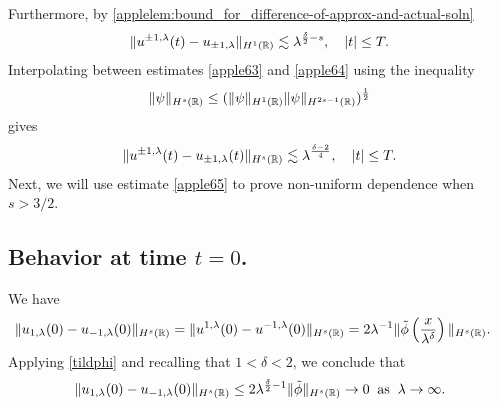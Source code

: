 %
%
Furthermore, by 
\cref{applelem:bound_for_difference-of-approx-and-actual-soln} 
%
%
\begin{equation}
\begin{split}
\|u^{\pm 1, \lambda}(t) - u_{\pm 1, \lambda} \|_{H^1(\mathbb{R})} \lesssim
\lambda^{\frac{\delta}{2} -s}, \quad |t| \le T.
\label{apple64}
\end{split}
\end{equation}
%
%
%
%
%
%
%
%
Interpolating between estimates \eqref{apple63} and \eqref{apple64} using 
the inequality
\begin{equation*}
\label{apple403}
\|\psi \|_{H^s (\mathbb{R})} \leq  (\| \psi \|_{H^1 (\mathbb{R})} \| \psi
\|_{H^{2s-1}(\mathbb{R})})^\frac12
\end{equation*}
%
%
gives
%
%
\begin{equation}
\begin{split}
\|u^{\pm 1, \lambda}(t) - u_{\pm 1, \lambda}(t)
\|_{H^s(\mathbb{R})}
\lesssim \lambda^{\frac{\delta -2}{4}}, \quad |t| \le T.
\label{apple65}
\end{split}
\end{equation}
%
%
Next, we will use estimate \eqref{apple65} to prove non-uniform
dependence when $s > 3/2$.

\subsection*{Behavior at time $t=0$.}  We have
%
%
%
%
\begin{equation*}
\begin{split}
\|u_{1,\lambda}(0) - u_{-1,\lambda}(0) \|_{H^s(\mathbb{R})} & = \|u^{1,\lambda}(0) 
- u^{-1,\lambda}(0) \|_{H^s(\mathbb{R})}
= 2 \lambda^{-1} \| \tilde{\phi}\left( \frac{x}{\lambda^\delta}
\right) \|_{H^s(\mathbb{R})}.
\label{apple}
\end{split}
\end{equation*}
%
%
%
%
Applying \eqref{tildphi} and recalling that $1<\delta<2$, we conclude that
%
%
\begin{equation}
\begin{split}
\|u_{1,\lambda}(0) - u_{-1,\lambda}(0) \|_{H^s(\mathbb{R})} \le 2
\lambda^{\frac{\delta}{2}-1} \|\tilde{\phi} \|_{H^s(\mathbb{R})} \to 0
\; \; \text{as} \; \; \lambda \to \infty.
\label{apple70}
\end{split}
\end{equation}
%
%
%
%
%  
%

